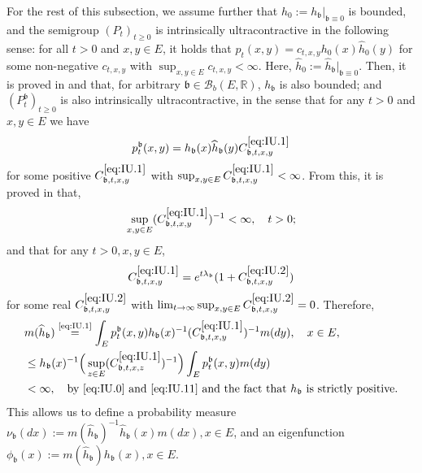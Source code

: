 \documentclass[12pt,a4paper]{amsart}
\numberwithin{equation}{section}
\theoremstyle{plain}
\theoremstyle{definition}
\theoremstyle{remark}
\begin{document}
	For the rest of this subsection, we assume further that $h_0:= h_\mathfrak b|_{\mathfrak{b} \equiv 0}$ is bounded, and the semigroup $(P_t)_{t\geq 0}$ is intrinsically ultracontractive in the following sense: for all $t>0$ and $x, y \in E$, it holds that $p_t(x,y) = c_{t,x,y} h_0(x) \widehat h_0(y)$ for some non-negative $c_{t,x,y}$ with $\sup_{x,y \in E} c_{t,x,y}< \infty$.
	Here, $\widehat h_0 := \widehat h_\mathfrak b|_{\mathfrak{b}\equiv 0}$.
	Then, it is proved in \cite{RenSongZhang2015Limit} and \cite{RenSongZhang2017Central} that, for arbitrary $\mathfrak b \in \mathcal B_b(E,\mathbb R)$, $h_\mathfrak b$ is also bounded; and $(P_t^\mathfrak b)_{t\geq 0}$ is also intrinsically ultracontractive, in the sense that for any $t> 0$ and $x,y \in E$ we have
\begin{equation} \label{eq:IU.1}
	p^\mathfrak b_t(x,y)
	= h_\mathfrak b(x) \widehat h_\mathfrak b (y) C^{\eqref{eq:IU.1}}_{\mathfrak b,t,x,y}
\end{equation}
	for some positive $C^{\eqref{eq:IU.1}}_{\mathfrak b,t,x,y}$ with $\sup_{x,y \in E} C^{\eqref{eq:IU.1}}_{\mathfrak b,t,x,y}< \infty$.
	From this, it is proved in \cite{KimSong2008Intrinsic} that,
\begin{equation} \label{eq:IU.11}
	\sup_{x,y \in E} (C^{\eqref{eq:IU.1}}_{\mathfrak b,t,x,y})^{-1}
	< \infty,
	\quad t>0;
\end{equation}
	and that for any $t>0, x,y \in E$,
\begin{equation}\label{eq:IU.2}
	C^{\eqref{eq:IU.1}}_{\mathfrak b,t,x,y}
	= e^{t\lambda_\mathfrak{b}} (1+ C^{\eqref{eq:IU.2}}_{\mathfrak b,t,x,y})
\end{equation}
	for some real $C^{\eqref{eq:IU.2}}_{\mathfrak b,t,x,y}$ with $\lim_{t\to \infty} \sup_{x,y \in E} C^{\eqref{eq:IU.2}}_{\mathfrak b,t,x,y} =0$.
	Therefore,
\begin{align}
	& m(\widehat h_{\mathfrak b}) \overset{\text{\eqref{eq:IU.1}}}= \int_{E} p_t^\mathfrak{b}(x,y)h_\mathfrak{b}(x)^{-1} (C^{\eqref{eq:IU.1}}_{\mathfrak b,t,x,y})^{-1} m(dy), \quad x\in E,
	\\&\leq  h_\mathfrak{b}(x)^{-1} \Big(\sup_{z\in E}(C^{\eqref{eq:IU.1}}_{\mathfrak b,t,x,z})^{-1}\Big)  \int_{E} p_t^\mathfrak{b}(x,y)m(dy)
	\\& < \infty,\quad\text{by \eqref{eq:IU.0} and \eqref{eq:IU.11} and the fact that $h_\mathfrak{b}$ is strictly positive}.
\end{align}
	This allows us to define a probability measure $\nu_\mathfrak b (dx):= m(\widehat h_{\mathfrak b})^{-1} \widehat h_\mathfrak b (x)m(dx), x\in E$, and an eigenfunction $\phi_\mathfrak{b}(x) := m(\widehat h_{\mathfrak b}) h_\mathfrak b(x), x\in E$.
\end{document}
